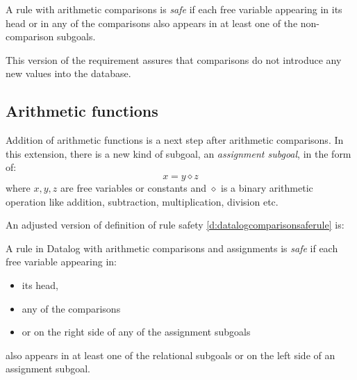 \begin{defn}
A rule with arithmetic comparisons is \emph{safe} if each free variable appearing in its head or in any of the comparisons also appears in at least one of the non-comparison subgoals.
\end{defn}\label{d:datalogcomparisonsaferule}

This version of the requirement assures that comparisons do not introduce any new values into the database.

\subsection{Arithmetic functions}

Addition of arithmetic functions is a next step after arithmetic comparisons. In this extension, there is a new kind of subgoal, an \emph{assignment subgoal}, in the form of:
$$x = y \diamond z$$
where $x, y, z$ are free variables or constants and $\diamond$ is a binary arithmetic operation like addition, subtraction, multiplication, division etc.


An adjusted version of definition of rule safety \ref{d:datalogcomparisonsaferule} is:

\begin{defn}
A rule in Datalog with arithmetic comparisons and assignments is \emph{safe} if each free variable appearing in:
\begin{itemize}
\item its head,
\item any of the comparisons 
\item or on the right side of any of the assignment subgoals
\end{itemize}
also appears in at least one of the relational subgoals or on the left side of an assignment subgoal.
\end{defn}\label{d:datalogeqsaferule}

